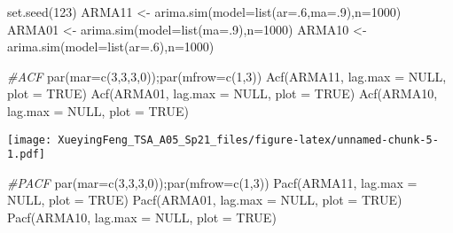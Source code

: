 \documentclass[
]{article}
\newenvironment{Shaded}{\begin{snugshade}}{\end{snugshade}}
\newcommand{\AttributeTok}[1]{\textcolor[rgb]{0.77,0.63,0.00}{#1}}
\newcommand{\CommentTok}[1]{\textcolor[rgb]{0.56,0.35,0.01}{\textit{#1}}}
\newcommand{\ConstantTok}[1]{\textcolor[rgb]{0.00,0.00,0.00}{#1}}
\newcommand{\DecValTok}[1]{\textcolor[rgb]{0.00,0.00,0.81}{#1}}
\newcommand{\FunctionTok}[1]{\textcolor[rgb]{0.00,0.00,0.00}{#1}}
\newcommand{\NormalTok}[1]{#1}
\newcommand{\OtherTok}[1]{\textcolor[rgb]{0.56,0.35,0.01}{#1}}
\begin{document}
\begin{Shaded}
\begin{Highlighting}[]
\FunctionTok{set.seed}\NormalTok{(}\DecValTok{123}\NormalTok{)}
\NormalTok{ARMA11 }\OtherTok{\textless{}{-}} \FunctionTok{arima.sim}\NormalTok{(}\AttributeTok{model=}\FunctionTok{list}\NormalTok{(}\AttributeTok{ar=}\NormalTok{.}\DecValTok{6}\NormalTok{,}\AttributeTok{ma=}\NormalTok{.}\DecValTok{9}\NormalTok{),}\AttributeTok{n=}\DecValTok{1000}\NormalTok{)}
\NormalTok{ARMA01 }\OtherTok{\textless{}{-}} \FunctionTok{arima.sim}\NormalTok{(}\AttributeTok{model=}\FunctionTok{list}\NormalTok{(}\AttributeTok{ma=}\NormalTok{.}\DecValTok{9}\NormalTok{),}\AttributeTok{n=}\DecValTok{1000}\NormalTok{)}
\NormalTok{ARMA10 }\OtherTok{\textless{}{-}} \FunctionTok{arima.sim}\NormalTok{(}\AttributeTok{model=}\FunctionTok{list}\NormalTok{(}\AttributeTok{ar=}\NormalTok{.}\DecValTok{6}\NormalTok{),}\AttributeTok{n=}\DecValTok{1000}\NormalTok{)}

\CommentTok{\#ACF}
\FunctionTok{par}\NormalTok{(}\AttributeTok{mar=}\FunctionTok{c}\NormalTok{(}\DecValTok{3}\NormalTok{,}\DecValTok{3}\NormalTok{,}\DecValTok{3}\NormalTok{,}\DecValTok{0}\NormalTok{));}\FunctionTok{par}\NormalTok{(}\AttributeTok{mfrow=}\FunctionTok{c}\NormalTok{(}\DecValTok{1}\NormalTok{,}\DecValTok{3}\NormalTok{))}
\FunctionTok{Acf}\NormalTok{(ARMA11, }\AttributeTok{lag.max =} \ConstantTok{NULL}\NormalTok{, }\AttributeTok{plot =} \ConstantTok{TRUE}\NormalTok{)}
\FunctionTok{Acf}\NormalTok{(ARMA01, }\AttributeTok{lag.max =} \ConstantTok{NULL}\NormalTok{, }\AttributeTok{plot =} \ConstantTok{TRUE}\NormalTok{)}
\FunctionTok{Acf}\NormalTok{(ARMA10, }\AttributeTok{lag.max =} \ConstantTok{NULL}\NormalTok{, }\AttributeTok{plot =} \ConstantTok{TRUE}\NormalTok{)}
\end{Highlighting}
\end{Shaded}

\texttt{[image: XueyingFeng\_TSA\_A05\_Sp21\_files/figure-latex/unnamed-chunk-5-1.pdf]}

\begin{Shaded}
\begin{Highlighting}[]
\CommentTok{\#PACF}
\FunctionTok{par}\NormalTok{(}\AttributeTok{mar=}\FunctionTok{c}\NormalTok{(}\DecValTok{3}\NormalTok{,}\DecValTok{3}\NormalTok{,}\DecValTok{3}\NormalTok{,}\DecValTok{0}\NormalTok{));}\FunctionTok{par}\NormalTok{(}\AttributeTok{mfrow=}\FunctionTok{c}\NormalTok{(}\DecValTok{1}\NormalTok{,}\DecValTok{3}\NormalTok{))}
\FunctionTok{Pacf}\NormalTok{(ARMA11, }\AttributeTok{lag.max =} \ConstantTok{NULL}\NormalTok{, }\AttributeTok{plot =} \ConstantTok{TRUE}\NormalTok{)}
\FunctionTok{Pacf}\NormalTok{(ARMA01, }\AttributeTok{lag.max =} \ConstantTok{NULL}\NormalTok{, }\AttributeTok{plot =} \ConstantTok{TRUE}\NormalTok{)}
\FunctionTok{Pacf}\NormalTok{(ARMA10, }\AttributeTok{lag.max =} \ConstantTok{NULL}\NormalTok{, }\AttributeTok{plot =} \ConstantTok{TRUE}\NormalTok{)}
\end{Highlighting}
\end{Shaded}
\end{document}
